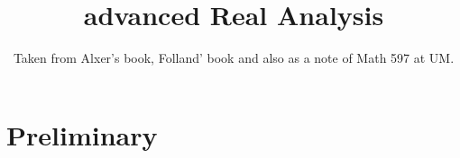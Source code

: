 \documentclass[lang=cn,11pt]{elegantbook}
\title{advanced Real Analysis}
\subtitle{Taken from Alxer's book, Folland' book and also as a note of Math 597 at UM.}
\begin{document}
\frontmatter
\tableofcontents
\mainmatter



\chapter{Preliminary}
\end{document}

